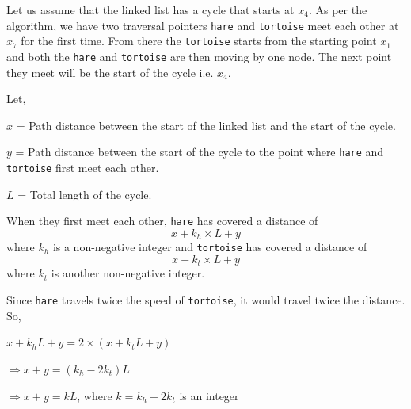 \documentclass[a4paper,11pt]{book}
\begin{document}
Let us assume that the linked list has a cycle that starts at $x_4$. As per the algorithm, we have two traversal pointers \lstinline{hare} and \lstinline{tortoise} meet each other at $x_7$ for the first time. From there the \lstinline{tortoise} starts from the starting point $x_1$ and both the \lstinline{hare} and \lstinline{tortoise} are then moving by one node. The next point they meet will be the start of the cycle i.e. $x_4$.
\vspace{5mm}

\begin{center}
\end{center}

Let,

\noindent $x$ = Path distance between the start of the linked list and the start of the cycle.

\noindent $y$ = Path distance between the start of the cycle to the point where \lstinline{hare} and \lstinline{tortoise} first meet each other.

\noindent $L$ = Total length of the cycle.

\noindent When they first meet each other, \lstinline{hare} has covered a distance of $$x + k_h\times L + y$$ where $k_h$ is a non-negative integer and \lstinline{tortoise} has covered a distance of $$x + k_t\times L + y$$ where $k_t$ is another non-negative integer.

Since \lstinline{hare} travels twice the speed of \lstinline{tortoise}, it would travel twice the distance. So,

$x + k_h L + y = 2\times (x + k_t L + y)$

$\Rightarrow x + y = (k_h - 2k_t) L$

$\Rightarrow x + y = k L$, where $k = k_h - 2k_t$ is an integer
\end{document}
